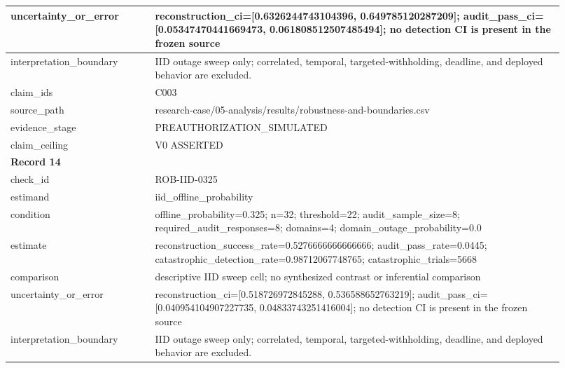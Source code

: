 \begin{longtable}{|p{0.24\linewidth}|p{0.68\linewidth}|}
uncertainty\_\allowbreak{}or\_\allowbreak{}error & reconstruction\_\allowbreak{}ci=[0.6326244743104396, 0.649785120287209];\allowbreak{} audit\_\allowbreak{}pass\_\allowbreak{}ci=[0.05347470441669473, 0.061808512507485494];\allowbreak{} no detection CI is present in the frozen source \\ \hline
interpretation\_\allowbreak{}boundary & IID outage sweep only;\allowbreak{} correlated, temporal, targeted-withholding, deadline, and deployed behavior are excluded. \\ \hline
claim\_\allowbreak{}ids & C003 \\ \hline
source\_\allowbreak{}path & research-case/05-analysis/results/robustness-and-boundaries.csv \\ \hline
evidence\_\allowbreak{}stage & PREAUTHORIZATION\_\allowbreak{}SIMULATED \\ \hline
claim\_\allowbreak{}ceiling & V0 ASSERTED \\ \hline
\multicolumn{2}{|l|}{\textbf{Record 14}} \\ \hline
check\_\allowbreak{}id & ROB-IID-0325 \\ \hline
estimand & iid\_\allowbreak{}offline\_\allowbreak{}probability \\ \hline
condition & offline\_\allowbreak{}probability=0.325;\allowbreak{} n=32;\allowbreak{} threshold=22;\allowbreak{} audit\_\allowbreak{}sample\_\allowbreak{}size=8;\allowbreak{} required\_\allowbreak{}audit\_\allowbreak{}responses=8;\allowbreak{} domains=4;\allowbreak{} domain\_\allowbreak{}outage\_\allowbreak{}probability=0.0 \\ \hline
estimate & reconstruction\_\allowbreak{}success\_\allowbreak{}rate=0.5276666666666666;\allowbreak{} audit\_\allowbreak{}pass\_\allowbreak{}rate=0.0445;\allowbreak{} catastrophic\_\allowbreak{}detection\_\allowbreak{}rate=0.98712067748765;\allowbreak{} catastrophic\_\allowbreak{}trials=5668 \\ \hline
comparison & descriptive IID sweep cell;\allowbreak{} no synthesized contrast or inferential comparison \\ \hline
uncertainty\_\allowbreak{}or\_\allowbreak{}error & reconstruction\_\allowbreak{}ci=[0.518726972845288, 0.536588652763219];\allowbreak{} audit\_\allowbreak{}pass\_\allowbreak{}ci=[0.040954104907227735, 0.04833743251416004];\allowbreak{} no detection CI is present in the frozen source \\ \hline
interpretation\_\allowbreak{}boundary & IID outage sweep only;\allowbreak{} correlated, temporal, targeted-withholding, deadline, and deployed behavior are excluded. \\ \hline

\end{longtable}
